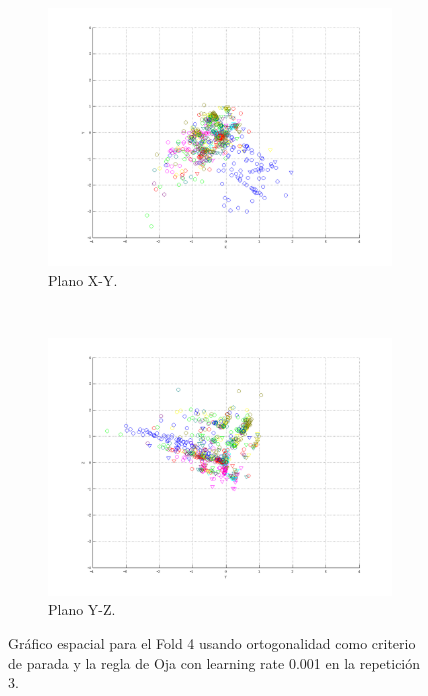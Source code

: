 \documentclass[informe.tex]{subfiles}
\begin{document}
\begin{figure}[H]
        \hspace*{-6.5cm}
        \begin{subfigure}[b]{0.49\textwidth}
                \includegraphics[width=\textwidth]{graficos/fold4_criterioParadao_reglaM_alpha0_rep3_2XY.png}
                \caption{Plano X-Y.}
        \end{subfigure}
        ~
        \begin{subfigure}[b]{0.49\textwidth}
                \includegraphics[width=\textwidth]{graficos/fold4_criterioParadao_reglaM_alpha0_rep3_3YZ.png}
                \caption{Plano Y-Z.}
        \end{subfigure}
	\restoregeometry
        \caption{Gráfico espacial para el Fold 4 usando ortogonalidad como criterio de parada y la regla de Oja con learning rate 0.001 en la repetición 3.}
        \label{fig:fold4_criterioParadao_reglaM_alpha0_rep3}
	\end{figure}
      
\end{document}
